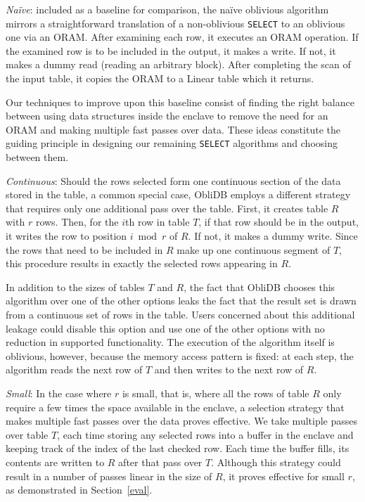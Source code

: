 \documentclass[letterpaper,twocolumn,10pt]{article}
\def\name/{ObliDB}
\begin{document}
\textit{Na\"ive}: included as a baseline for comparison, the na\"ive oblivious algorithm mirrors a straightforward translation of a non-oblivious \texttt{SELECT} to an oblivious one via an ORAM. After examining each row, it executes an ORAM operation. If the examined row is to be included in the output, it makes a write. If not, it makes a dummy read (reading an arbitrary block). After completing the scan of the input table, it copies the ORAM to a Linear table which it returns.

Our techniques to improve upon this baseline consist of finding the right balance between using data structures inside the enclave to remove the need for an ORAM and making multiple fast passes over data. These ideas constitute the guiding principle in designing our remaining \texttt{SELECT} algorithms and choosing between them.

\textit{Continuous}: Should the rows selected form one continuous section of the data stored in the table, a common special case, \name/ employs a different strategy that requires only one additional pass over the table. First, it creates table $R$ with $r$ rows. Then, for the $i$th row in table $T$, if that row should be in the output, it writes the row to position $i\bmod r$ of $R$. If not, it makes a dummy write. Since the rows that need to be included in $R$ make up one continuous segment of $T$, this procedure results in exactly the selected rows appearing in $R$.

In addition to the sizes of tables $T$ and $R$, the fact that \name/ chooses this algorithm over one of the other options leaks the fact that the result set is drawn from a continuous set of rows in the table. Users concerned about this additional leakage could disable this option and use one of the other options with no reduction in supported functionality. The execution of the algorithm itself is oblivious, however, because the memory access pattern is fixed: at each step, the algorithm reads the next row of $T$ and then writes to the next row of $R$.

\textit{Small}: In the case where $r$ is small, that is, where all the rows of table $R$ only require a few times the space available in the enclave, a selection strategy that makes multiple fast passes over the data proves effective. We take multiple passes over table $T$, each time storing any selected rows into a buffer in the enclave and keeping track of the index of the last checked row. Each time the buffer fills, its contents  are written to $R$ after that pass over $T$. Although this strategy could result in a number of passes linear in the size of $R$, it proves effective for small $r$, as demonstrated in Section~\ref{eval}.
\end{document}
